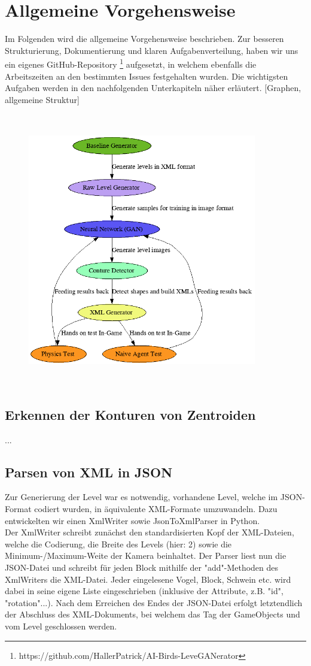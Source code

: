 \section{Allgemeine Vorgehensweise}
Im Folgenden wird die allgemeine Vorgehensweise beschrieben. Zur besseren Strukturierung, Dokumentierung und klaren Aufgabenverteilung, haben wir uns ein eigenes GitHub-Repository \footnote{https://github.com/HallerPatrick/AI-Birds-LeveGANerator} aufgesetzt, in welchem ebenfalls die Arbeitszeiten an den bestimmten Issues festgehalten wurden. Die wichtigsten Aufgaben werden in den nachfolgenden Unterkapiteln näher erläutert. [Graphen, allgemeine Struktur]

\begin{figure}
    \centering
    \includegraphics[height=12cm, width=10cm]{img/project_structure.png}
\end{figure}

\subsection{Erkennen der  Konturen von Zentroiden}
...
\subsection{Parsen von XML in JSON}
Zur Generierung der Level war es notwendig, vorhandene Level, welche im JSON-Format codiert wurden, in äquivalente XML-Formate umzuwandeln. Dazu entwickelten wir einen XmlWriter sowie JsonToXmlParser in Python. \\ Der XmlWriter schreibt zunächst den standardisierten Kopf der XML-Dateien, welche die Codierung, die Breite des Levels (hier: 2) sowie die Minimum-/Maximum-Weite der Kamera beinhaltet. Der Parser liest nun die JSON-Datei und schreibt für jeden Block mithilfe der "add"-Methoden des XmlWriters die XML-Datei. Jeder eingelesene Vogel, Block, Schwein etc. wird dabei in seine eigene Liste eingeschrieben (inklusive der Attribute, z.B. "id", "rotation"...). Nach dem Erreichen des Endes der JSON-Datei erfolgt letztendlich der Abschluss des XML-Dokuments, bei welchem das Tag der GameObjects und vom Level geschlossen werden.
